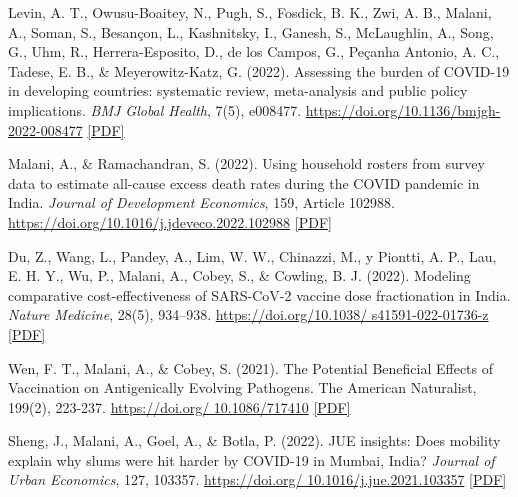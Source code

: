 \begin{tablist}
        \item[2022] \tab{}Levin, A. T., Owusu-Boaitey, N., Pugh, S., Fosdick, B. K., Zwi, A. B., Malani, A., Soman, S., Besançon, L., Kashnitsky, I., Ganesh, S., McLaughlin, A., Song, G., Uhm, R., Herrera-Esposito, D., de los Campos, G., Peçanha Antonio, A. C., Tadese, E. B., \& Meyerowitz-Katz, G. (2022). Assessing the burden of COVID-19 in developing countries: systematic review, meta-analysis and public policy implications. \textit{BMJ Global Health}, 7(5), e008477. \href{https://doi.org/10.1136/bmjgh-2022-008477}{https://doi.org/10.1136/bmjgh-2022-008477} \href{https://github.com/anup-malani/website_personal/blob/main/publications/2022_LevinMalaniEtAl_BMJGlobalHealth_COVIDMortalityDeveloping%20Countries.pdf}{[PDF]} 

        \item[2022] \tab{}Malani, A., \& Ramachandran, S. (2022). Using household rosters from survey data to estimate all-cause excess death rates during the COVID pandemic in India. \textit{Journal of Development Economics}, 159, Article 102988. \href{https://doi.org/10.1016/j.jdeveco.2022.102988}{https://doi.org/10.1016/j.jdeveco.2022.102988} \href{https://github.com/anup-malani/website_personal/blob/main/publications/2022_MalaniRamachandran_JDE_MortalityCOVID.pdf}{[PDF]}
        
        \item[2022] \tab{}Du, Z., Wang, L., Pandey, A., Lim, W. W., Chinazzi, M., y Piontti, A. P., Lau, E. H. Y., Wu, P., Malani, A., Cobey, S., \& Cowling, B. J. (2022). Modeling comparative cost-effectiveness of SARS-CoV-2 vaccine dose fractionation in India. \textit{Nature Medicine}, 28(5), 934–938. \href{https://doi.org/10.1038/s41591-022-01736-z}{https://doi.org/10.1038/ s41591-022-01736-z} \href{https://github.com/anup-malani/website_personal/blob/main/publications/2022_DuMalaniEtAl_NatureMed_DoseFractionation.pdf}{[PDF]}
        
        \item[2022] \tab{}Wen, F. T., Malani, A., \& Cobey, S. (2021). The Potential Beneficial Effects of Vaccination on Antigenically Evolving Pathogens. The American Naturalist, 199(2), 223-237. \href{https://doi.org/10.1086/717410}{https://doi.org/ 10.1086/717410} \href{https://github.com/anup-malani/website_personal/blob/main/publications/2022_WenMalaniCobey_AmerNaturalist_FluEvolution.pdf}{[PDF]} 

        \item[2022] \tab{}Sheng, J., Malani, A., Goel, A., \& Botla, P. (2022). JUE insights: Does mobility explain why slums were hit harder by COVID-19 in Mumbai, India? \textit{Journal of Urban Economics}, 127, 103357. \href{https://doi.org/10.1016/j.jue.2021.103357}{https://doi.org/ 10.1016/j.jue.2021.103357} \href{https://github.com/anup-malani/website_personal/blob/main/publications/2022_ShengMalaniEtAl_JUE_SlumMobilityCOVID.pdf}{[PDF]}
        

\end{tablist}

